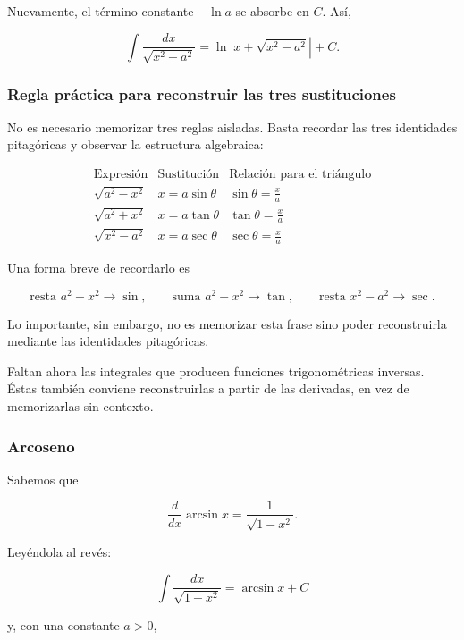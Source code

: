 \documentclass[12pt]{article}
\theoremstyle{definition}
\theoremstyle{remark}
\begin{document}
Nuevamente, el término constante $-\ln a$ se absorbe en $C$. Así,

\[
\boxed{
\int\frac{dx}{\sqrt{x^2-a^2}}
=\ln|x+\sqrt{x^2-a^2}|+C.}
\]

\subsubsection*{Regla práctica para reconstruir las tres sustituciones}

No es necesario memorizar tres reglas aisladas. Basta recordar las tres
identidades pitagóricas y observar la estructura algebraica:

\[
\boxed{
\begin{array}{c|c|c}
\text{Expresión} & \text{Sustitución} & \text{Relación para el triángulo}\\ \hline
\sqrt{a^2-x^2} & x=a\sin\theta & \displaystyle\sin\theta=\frac{x}{a}\\[3mm]
\sqrt{a^2+x^2} & x=a\tan\theta & \displaystyle\tan\theta=\frac{x}{a}\\[3mm]
\sqrt{x^2-a^2} & x=a\sec\theta & \displaystyle\sec\theta=\frac{x}{a}
\end{array}}
\]

Una forma breve de recordarlo es

\[
\boxed{
\text{resta }a^2-x^2\longrightarrow\sin,
\qquad
\text{suma }a^2+x^2\longrightarrow\tan,
\qquad
\text{resta }x^2-a^2\longrightarrow\sec.}
\]

Lo importante, sin embargo, no es memorizar esta frase sino poder reconstruirla
mediante las identidades pitagóricas.

Faltan ahora las integrales que producen funciones trigonométricas
inversas. Éstas también conviene reconstruirlas a partir de las
derivadas, en vez de memorizarlas sin contexto.

\subsubsection*{Arcoseno}

Sabemos que

\[
\frac{d}{dx}\arcsin x
=
\frac{1}{\sqrt{1-x^2}}.
\]

Leyéndola al revés:

\[
\boxed{
\int\frac{dx}{\sqrt{1-x^2}}
=
\arcsin x+C
}
\]

y, con una constante \(a>0\),
\end{document}
